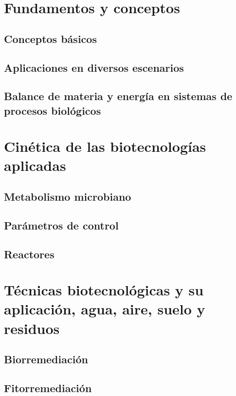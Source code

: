 \documentclass{../Resume}
\begin{document}
\Portada
\Indice
\fancystyle
\onehalfspacing


\part{Fundamentos y conceptos}

    \chapter{Conceptos básicos}
    \chapter{Aplicaciones en diversos escenarios}
    \chapter{Balance de materia y energía en sistemas de procesos biológicos}

\part{Cinética de las biotecnologías aplicadas}

    \chapter{Metabolismo microbiano}
    \chapter{Parámetros de control}
    \chapter{Reactores}

\part{Técnicas biotecnológicas y su aplicación, agua, aire, suelo y residuos}

    \chapter{Biorremediación}
    \chapter{Fitorremediación}
\end{document}

